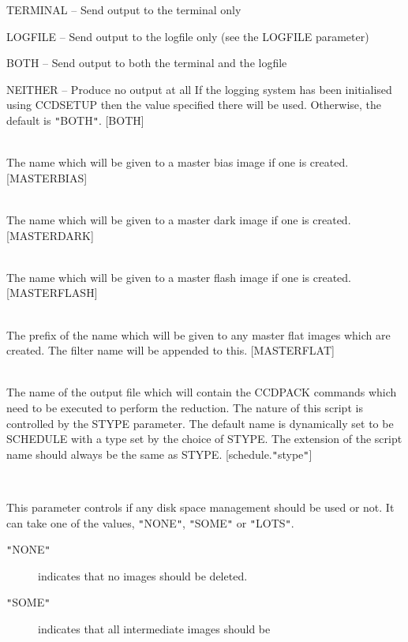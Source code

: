 \documentclass[twoside,11pt]{article}
\newcommand{\htmlref}[2]{#1}
\renewcommand{\_}{\texttt{\symbol{95}}}
\newcommand{\qt}[1]{{\tt "}#1{\tt "}}
\newcommand{\routine}[1]{{\sc #1}}
\newcommand{\xroutine}[1]{\htmlref{{\sc #1}}{#1}}
\newcommand{\sstsubsection}[1]{ \item[{#1}] \mbox{} \\}
\newcommand{\sstitem}{\item}
\newcommand{\sstsubsection}[1]{\item[{#1}]}
\newcommand{\sstitem}{\item}
\begin{document}
{{{{            \sstitem
               TERMINAL  -- Send output to the terminal only

            \sstitem
               LOGFILE   -- Send output to the logfile only (see the
                               LOGFILE parameter)

            \sstitem
               BOTH      -- Send output to both the terminal and the
                               logfile

            \sstitem
               NEITHER   -- Produce no output at all
            If the logging system has been initialised using \xroutine{CCDSETUP}
            then the value specified there will be used. Otherwise, the
            default is \qt{BOTH}.
            [BOTH]
         }
      }
      \sstsubsection{
         MASTERBIAS = LITERAL (Read)
      }{
         The name which will be given to a master bias image if one is
         created.
         [MASTER\_BIAS]
      }
      \sstsubsection{
         MASTERDARK = LITERAL (Read)
      }{
         The name which will be given to a master dark image if one is
         created.
         [MASTER\_DARK]
      }
      \sstsubsection{
         MASTERFLASH = LITERAL (Read)
      }{
         The name which will be given to a master flash image if one is
         created.
         [MASTER\_FLASH]
      }
      \sstsubsection{
         MASTERFLAT = LITERAL (Read)
      }{
         The prefix of the name which will be given to any master flat
         images which are created. The filter name will be appended to
         this.
         [MASTER\_FLAT]
      }
      \sstsubsection{
         SCRIPT = LITERAL (Read)
      }{
         The name of the output file which will contain the CCDPACK
         commands which need to be executed to perform the reduction. The
         nature of this script is controlled by the STYPE parameter. The
         default name is dynamically set to be \routine{SCHEDULE} with a type set
         by the choice of STYPE. The extension of the script name should
         always be the same as STYPE.
         [schedule.\qt{stype}]
      }
      \sstsubsection{
         SPACESAVE = LITERAL (Read)
      }{
         This parameter controls if any disk space management should be
         used or not. It can take one of the values, \qt{NONE},
         \qt{SOME} or \qt{LOTS}.
         \begin{description}
            \item[\qt{NONE}] indicates that no images should be deleted.
            \item [\qt{SOME}] indicates that all intermediate images should be

\end{description}}}}
\end{document}
